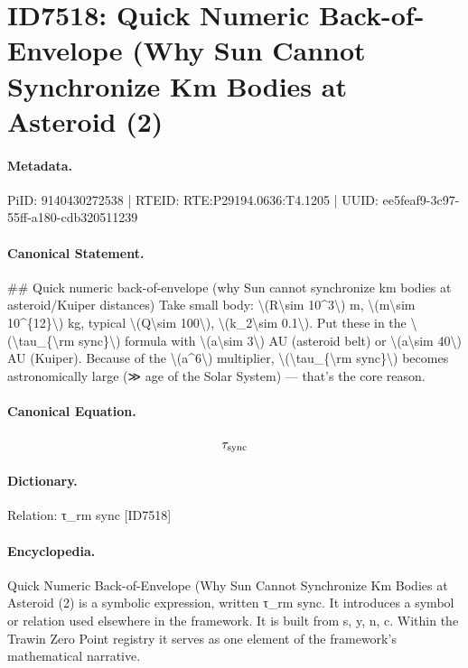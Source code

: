\section*{ID7518: Quick Numeric Back-of-Envelope (Why Sun Cannot Synchronize Km Bodies at Asteroid (2)}
\paragraph{Metadata.}
PiID: 9140430272538 | RTEID: RTE:P29194.0636:T4.1205 | UUID: ee5feaf9-3c97-55ff-a180-cdb320511239

\paragraph{Canonical Statement.}
\#\# Quick numeric back-of-envelope (why Sun cannot synchronize km bodies at asteroid/Kuiper distances) Take small body: \textbackslash{}(R\textbackslash{}sim 10\textasciicircum{}3\textbackslash{}) m, \textbackslash{}(m\textbackslash{}sim 10\textasciicircum{}\{12\}\textbackslash{}) kg, typical \textbackslash{}(Q\textbackslash{}sim 100\textbackslash{}), \textbackslash{}(k\_2\textbackslash{}sim 0.1\textbackslash{}). Put these in the \textbackslash{}(\textbackslash{}tau\_\{\textbackslash{}rm sync\}\textbackslash{}) formula with \textbackslash{}(a\textbackslash{}sim 3\textbackslash{}) AU (asteroid belt) or \textbackslash{}(a\textbackslash{}sim 40\textbackslash{}) AU (Kuiper). Because of the \textbackslash{}(a\textasciicircum{}6\textbackslash{}) multiplier, \textbackslash{}(\textbackslash{}tau\_\{\textbackslash{}rm sync\}\textbackslash{}) becomes astronomically large (≫ age of the Solar System) — that’s the core reason.

\paragraph{Canonical Equation.}
\[
\tau_{\rm sync}
\]

\paragraph{Dictionary.}
Relation: τ\_rm sync [ID7518]

\paragraph{Encyclopedia.}
Quick Numeric Back-of-Envelope (Why Sun Cannot Synchronize Km Bodies at Asteroid (2) is a symbolic expression, written τ\_rm sync. It introduces a symbol or relation used elsewhere in the framework. It is built from s, y, n, c. Within the Trawin Zero Point registry it serves as one element of the framework's mathematical narrative.
